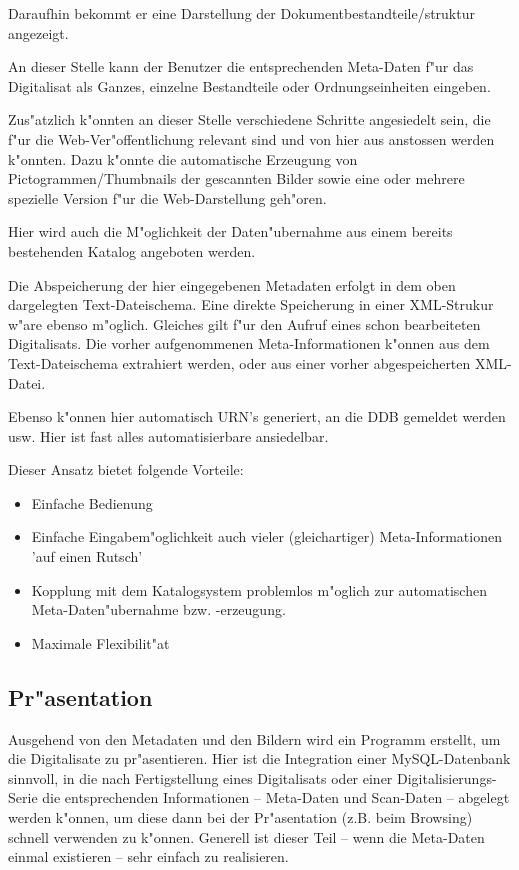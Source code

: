 \documentclass[11pt, twoside, a4paper, BCOR8mm, DIV12, bibtotoc,idxtotoc]{scrreprt}
\begin{document}
Daraufhin bekommt er eine Darstellung der Dokumentbestandteile/struktur
angezeigt. 

An dieser Stelle kann der Benutzer die entsprechenden Meta-Daten f"ur
das Digitalisat als Ganzes, einzelne Bestandteile oder
Ordnungseinheiten eingeben.

Zus"atzlich k"onnten an dieser Stelle verschiedene Schritte
angesiedelt sein, die f"ur die Web-Ver"offentlichung relevant sind und
von hier aus anstossen werden k"onnten. Dazu k"onnte die automatische
Erzeugung von Pictogrammen/Thumbnails der gescannten Bilder sowie eine
oder mehrere spezielle Version f"ur die Web-Darstellung geh"oren.

Hier wird auch die M"oglichkeit der Daten"uber\-nahme aus einem
bereits bestehenden Katalog angeboten werden.

Die Abspeicherung der hier eingegebenen Metadaten erfolgt in dem oben
dargelegten Text-Dateischema.  Eine direkte Speicherung in einer
XML-Strukur w"are ebenso m"oglich. Gleiches gilt f"ur den Aufruf eines
schon bearbeiteten Digitalisats. Die vorher aufgenommenen
Meta-Informationen k"onnen aus dem Text-Dateischema extrahiert werden,
oder aus einer vorher ab\-ge\-spei\-cher\-ten XML-Datei.

Ebenso k"onnen hier automatisch URN's generiert, an die DDB gemeldet
werden usw. Hier ist fast alles automatisierbare ansiedelbar.

Dieser Ansatz bietet folgende Vorteile:

\begin{itemize}
\item Einfache Bedienung
\item Einfache Eingabem"oglichkeit auch vieler (gleichartiger)
Meta-Informationen 'auf einen Rutsch'
\item Kopplung mit dem Katalogsystem problemlos m"oglich zur
automatischen Meta-Daten\-"uber\-nahme bzw. -er\-zeugung.
\item Maximale Flexibilit"at
\end{itemize}


\subsection{Pr"asentation}

Ausgehend von den Metadaten und den Bildern wird ein Programm
erstellt, um die Digitalisate zu pr"asentieren. Hier ist die
Integration einer MySQL-Datenbank sinnvoll, in die nach Fertigstellung
eines Digitalisats oder einer Digitalisie\-rungs-Serie die
entsprechenden Informationen -- Meta-Daten und Scan-Daten -- abgelegt
werden k"onnen, um diese dann bei der Pr"asentation (z.B. beim
Browsing) schnell verwenden zu k"onnen. Generell ist dieser Teil --
wenn die Meta-Daten einmal existieren -- sehr einfach zu realisieren.
\end{document}
